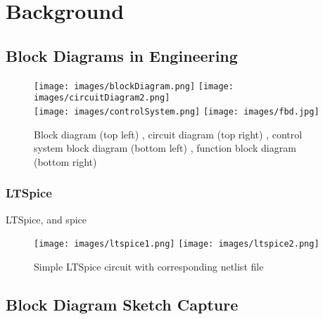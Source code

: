 \begin{comment}

\end{comment}


\chapter{Background}

\section{Block Diagrams in Engineering}



\begin{figure}[ht!]
\texttt{[image: images/blockDiagram.png]}
\hspace{0.5 cm}
\texttt{[image: images/circuitDiagram2.png]} \\
\texttt{[image: images/controlSystem.png]} 
\hspace{0.5 cm}
\texttt{[image: images/fbd.jpg]} 
\centering
\caption{Block diagram (top left) \cite{wiringDiagrams}, circuit diagram (top right) \cite{engineeronadisk}, control system block diagram (bottom left) \cite{engineeronadisk}, function block diagram (bottom right) \cite{wikicommonsFbd}}
\label{im:blockExample}
\end{figure}




\subsection{LTSpice}


LTSpice, and spice 


\begin{figure}[ht!]
\centering
\texttt{[image: images/ltspice1.png]}
\texttt{[image: images/ltspice2.png]}
\caption{Simple LTSpice circuit with corresponding netlist file \cite{ltspice}}
\label{im:ltspice}
\end{figure}

\clearpage




\section{Block Diagram Sketch Capture}



